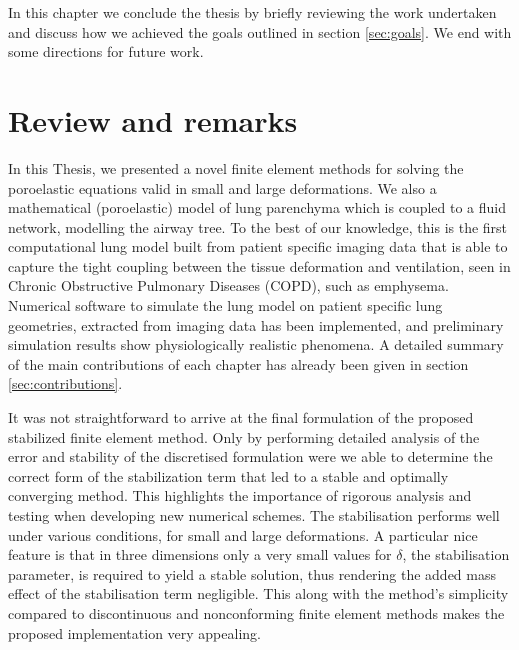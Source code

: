 In this chapter we conclude the thesis by briefly reviewing the work undertaken and discuss how we achieved the goals outlined in section \ref{sec:goals}. %
We end with some directions for future work.


\section{Review and remarks}
In this Thesis, we presented a novel finite element methods for solving the poroelastic equations valid in small and large deformations. We also a mathematical (poroelastic) model of lung parenchyma which is coupled to a fluid network, modelling the airway tree. 
To the best of our knowledge, this is the first computational lung model built from patient specific imaging data that is able to capture the tight coupling between the tissue deformation and ventilation, seen in Chronic Obstructive Pulmonary Diseases (COPD), such as emphysema. Numerical software to simulate the lung model on patient specific lung geometries, extracted from imaging data has been implemented, and preliminary simulation results show physiologically realistic phenomena. A detailed summary of the main contributions of each chapter has already been given in section \ref{sec:contributions}.



It was not straightforward to arrive at the final formulation of the proposed stabilized finite element method. Only by performing detailed analysis of the error and stability of the discretised formulation were we able to determine the correct form of the stabilization term that led to a stable and optimally converging method. This highlights the importance of rigorous analysis and testing when developing new numerical schemes. The stabilisation performs well under various conditions, for small and large deformations. A particular nice feature is that in three dimensions only a very small values for $\delta$, the stabilisation parameter, is required to yield a stable solution, thus rendering the added mass effect of the stabilisation term negligible. This along with the method's simplicity compared to discontinuous and nonconforming finite element methods makes the proposed implementation very appealing.

